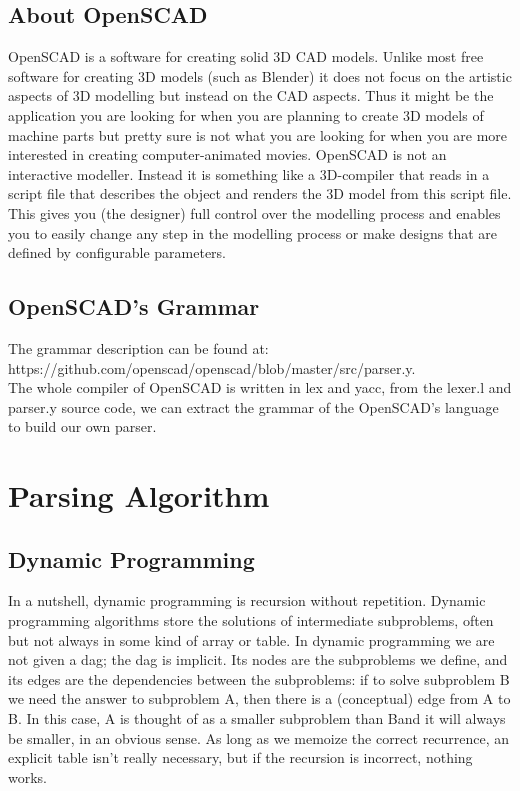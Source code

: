\documentclass{article}
\begin{document}
\subsection{About OpenSCAD}
OpenSCAD is a software for creating solid 3D CAD models.  Unlike most free software for creating 3D models (such as Blender) it does not focus on the artistic aspects of 3D modelling but instead on the CAD aspects. Thus it might be the application you are looking for when you are planning to create 3D models of machine parts but pretty sure is not what you are looking for when you are more interested in creating computer-animated movies.
OpenSCAD is not an interactive modeller. Instead it is something like a 3D-compiler that reads in a script file that describes the object and renders the 3D model from this script file. This gives you (the designer) full control over the modelling process and enables you to easily change any step in the modelling process or make designs that are defined by configurable parameters.

\subsection{OpenSCAD's Grammar}
The grammar description can be found at: 
 https://github.com/openscad/openscad/blob/master/src/parser.y.\\
The whole compiler of OpenSCAD is written in lex and yacc, from the lexer.l and parser.y source code, we can extract the grammar of the OpenSCAD's language
to build our own parser.

\section{Parsing Algorithm}
\subsection{Dynamic Programming}

In a nutshell, dynamic programming is recursion without repetition. Dynamic programming
algorithms store the solutions of intermediate subproblems, often but not always in some kind of
array or table. 
In dynamic programming we are not given a dag; the dag is implicit. Its nodes are
the subproblems we define, and its edges are the dependencies between the subproblems: if
to solve subproblem B we need the answer to subproblem A, then there is a (conceptual) edge
from A to B. In this case, A is thought of as a smaller subproblem than Band it will always
be smaller, in an obvious sense.
As long as we memoize the correct recurrence, an explicit table isn’t really
necessary, but if the recursion is incorrect, nothing works.
\end{document}
